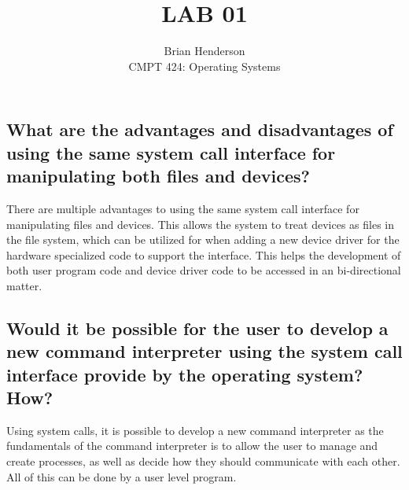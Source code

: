 \documentclass[12pt]{article}
\begin{document}
 
\title{LAB 01	}
\author{Brian Henderson \\ 
		CMPT 424: Operating Systems}
\maketitle

\subsection*{What are the advantages and disadvantages of using the same system call interface for manipulating both files and devices?}

There are multiple advantages to using the same system call interface for manipulating files and devices. This allows the system to treat devices as files in the file system, which can be utilized for when adding a new device driver for the hardware specialized code to support the interface. This helps the development of both user program code and device driver code to be accessed in an bi-directional matter.


\subsection*{Would it be possible for the user to develop a new command interpreter using the system call interface provide by the operating system? How?}

Using system calls, it is possible to develop a new command interpreter as the fundamentals of the command interpreter is to allow the user to manage and create processes, as well as decide how they should communicate with each other. All of this can be done by a user level program.


 
\end{document}
